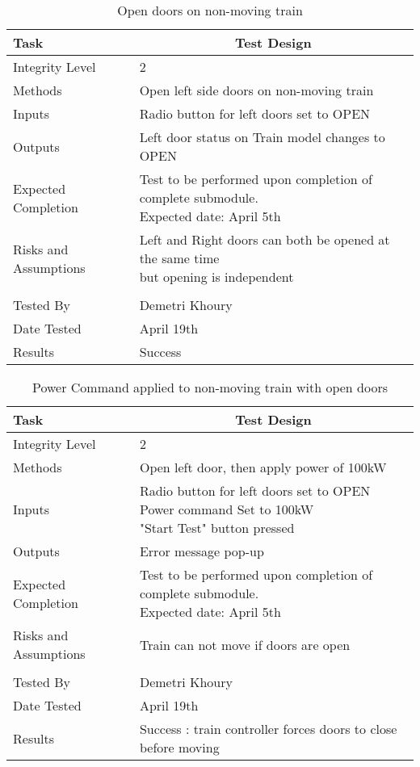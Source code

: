 \documentclass[]{article}
\begin{document}
	\begin{table}[H]
		\centering
		\caption{Open doors on non-moving train}
		\begin{tabular}{|l|l|}
			\hline
			Task & \multicolumn{1}{c|}{Test Design} \\ \hline
			Integrity Level & 2 \\ \hline
			Methods & Open left side doors on non-moving train  \\ \hline
			Inputs &  Radio button for left doors set to OPEN \\ \hline
			Outputs & Left door status on Train model changes to OPEN\\ \hline
			Expected Completion & \parbox[t]{10cm}{Test to be performed upon completion of complete submodule.\\ Expected date: April 5th}\\ \hline
			Risks and Assumptions &\parbox[t]{10cm}{ Left and Right doors can both be opened at the same time \\ but opening is independent}\\ \hline
			\\ \hline
			Tested By   &  Demetri Khoury\\	\hline
			Date Tested & \parbox[t]{10cm}{April 19th}\\ \hline
			Results & Success\\ \hline
		\end{tabular}
	\end{table}

	\begin{table}[H]
		\centering
		\caption{Power Command applied to non-moving train with open doors}
		\begin{tabular}{|l|l|}
			\hline
			Task & \multicolumn{1}{c|}{Test Design} \\ \hline
			Integrity Level & 2 \\ \hline
			Methods & Open left door, then apply power of 100kW  \\ \hline
			Inputs &  \parbox[t]{10cm}{Radio button for left doors set to OPEN\\ Power command Set to 100kW\\ "Start Test" button pressed }\\ \hline
			Outputs & Error message pop-up\\ \hline
			Expected Completion & \parbox[t]{10cm}{Test to be performed upon completion of complete submodule.\\ Expected date: April 5th}\\ \hline
			Risks and Assumptions & Train can not move if doors are open\\ \hline
			\\ \hline
			Tested By   &  Demetri Khoury\\	\hline
			Date Tested & \parbox[t]{10cm}{April 19th}\\ \hline
			Results & Success : train controller forces doors to close before moving\\ \hline
		\end{tabular}
	\end{table}
\end{document}
